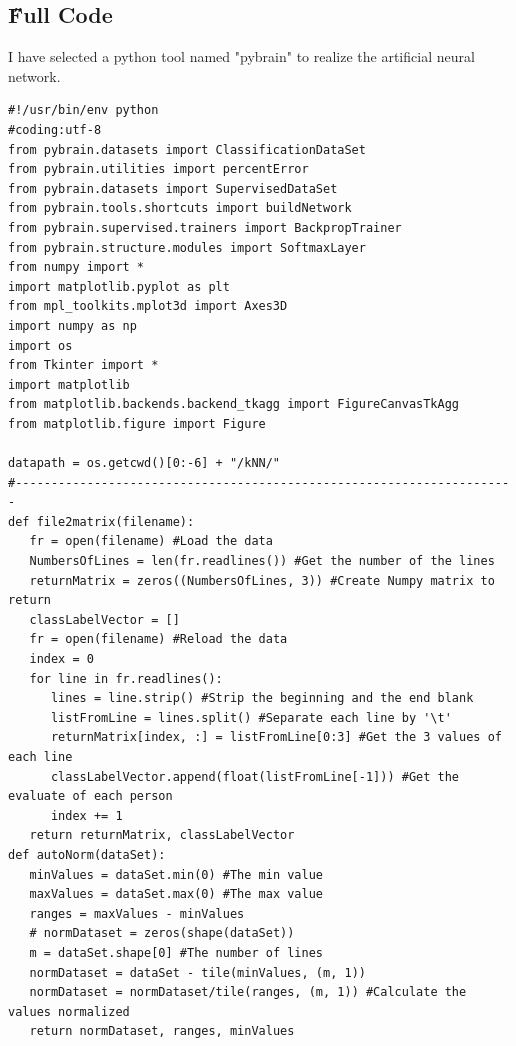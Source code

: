 \documentclass[12pt]{article}
\begin{document}
\subsection{\H Full Code}
I have selected a python tool named "pybrain" to realize the artificial neural network.
\begin{lstlisting}
#!/usr/bin/env python
#coding:utf-8
from pybrain.datasets import ClassificationDataSet
from pybrain.utilities import percentError
from pybrain.datasets import SupervisedDataSet
from pybrain.tools.shortcuts import buildNetwork
from pybrain.supervised.trainers import BackpropTrainer
from pybrain.structure.modules import SoftmaxLayer
from numpy import *
import matplotlib.pyplot as plt
from mpl_toolkits.mplot3d import Axes3D
import numpy as np
import os
from Tkinter import *
import matplotlib
from matplotlib.backends.backend_tkagg import FigureCanvasTkAgg
from matplotlib.figure import Figure

datapath = os.getcwd()[0:-6] + "/kNN/"
#----------------------------------------------------------------------
def file2matrix(filename):
   fr = open(filename) #Load the data
   NumbersOfLines = len(fr.readlines()) #Get the number of the lines
   returnMatrix = zeros((NumbersOfLines, 3)) #Create Numpy matrix to return
   classLabelVector = []
   fr = open(filename) #Reload the data
   index = 0
   for line in fr.readlines():
      lines = line.strip() #Strip the beginning and the end blank
      listFromLine = lines.split() #Separate each line by '\t'
      returnMatrix[index, :] = listFromLine[0:3] #Get the 3 values of each line
      classLabelVector.append(float(listFromLine[-1])) #Get the evaluate of each person
      index += 1
   return returnMatrix, classLabelVector
def autoNorm(dataSet):
   minValues = dataSet.min(0) #The min value
   maxValues = dataSet.max(0) #The max value
   ranges = maxValues - minValues
   # normDataset = zeros(shape(dataSet))
   m = dataSet.shape[0] #The number of lines
   normDataset = dataSet - tile(minValues, (m, 1))
   normDataset = normDataset/tile(ranges, (m, 1)) #Calculate the values normalized
   return normDataset, ranges, minValues


\end{lstlisting}
\end{document}
